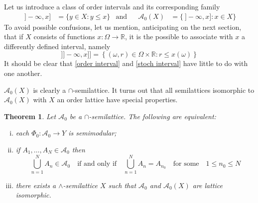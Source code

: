 \documentclass[11pt]{amsart}
\newtheorem{theorem}{Theorem}
\theoremstyle{plain}
\begin{document}
Let us introduce a class of order intervals and its corresponding family
\begin{align}
\label{order interval}
{\ ]-\infty,x]}&=\{y\in X:y\le x\}
&\text{and}&
&{\mathscr{A}}_0(X)&=\{{\ ]-\infty,x]}:x\in X\}
\end{align}
To avoid possible confusions, let us mention, anticipating on the next section, that
if $X$ consists of functions $x:\Omega\to{\mathbb{R}}$, it is the possible to associate with $x$
a differently defined interval, namely 
\begin{equation}
\label{stoch interval}
]]-\infty,x]]=\left\{(\omega,r)\in\Omega\times{\mathbb{R}}:r\le x(\omega)\right\}
\end{equation}
It should be clear that \eqref{order interval} and \eqref{stoch interval} have little
to do with one another.

${\mathscr{A}}_0(X)$ is clearly a $\cap$-semilattice. It turns out that all semilattices 
isomorphic to ${\mathscr{A}}_0(X)$ with $X$ an order lattice have special properties.

\begin{theorem}
\label{th iso}
Let ${\mathscr{A}}_0$ be a $\cap$-semilattice. The following are equivalent:
\begin{enumerate}[(i)]
\item\label{all} 
each $\Phi_0:{\mathscr{A}}_0\to Y$ is semimodular;
\item\label{iproperty} 
if $A_1,\ldots,A_N\in{\mathscr{A}}_0$ then 
\begin{equation}
\label{property}
\bigcup_{n=1}^NA_n\in{\mathscr{A}}_0
\quad\text{if and only if}\quad
\bigcup_{n=1}^NA_n=A_{n_0}
\quad\text{for some}\quad1\le n_0\le N
\end{equation}
\item\label{isomorphism} 
there exists a $\wedge$-semilattice $X$ such that ${\mathscr{A}}_0$ and ${\mathscr{A}}_0(X)$ are
lattice isomorphic.
\end{enumerate}
\end{theorem}
\end{document}
